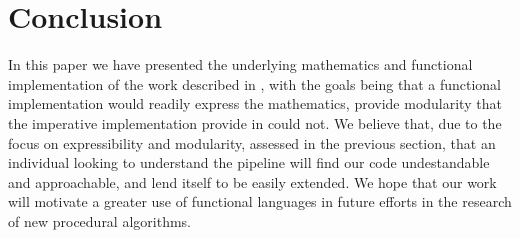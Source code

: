 \documentclass[twocolumn]{article}
\begin{document}
\section{Conclusion}
In this paper we have presented the underlying mathematics and functional
implementation of the work described in \cite{chen}, with the goals being that
a functional implementation would readily express the mathematics, provide
modularity that the imperative implementation provide in \cite{chen} could not.
We believe that, due to the focus on expressibility and modularity, assessed in
the previous section, that an individual looking to understand the pipeline
will find our code undestandable and approachable, and lend itself to be
easily extended. We hope that our work will motivate a greater use of
functional languages in future efforts in the research of new procedural
algorithms. 



\end{document}
